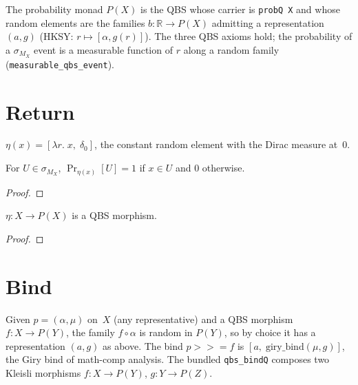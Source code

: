\begin{definition}\label{def:monadP}
  \rocqok
  The probability monad $P(X)$ is the QBS whose carrier is
  \texttt{probQ X} and whose random elements are the families
  $b : \mathbb{R} \to P(X)$ admitting a representation $(a, g)$
  (HKSY: $r \mapsto [\alpha, g(r)]$). The three QBS axioms hold; the
  probability of a $\sigma_{M_X}$ event is a measurable function of $r$
  along a random family (\texttt{measurable\_qbs\_event}).
\end{definition}


\section{Return}\label{sec:return}

\begin{definition}\label{def:qbs_return}
  \rocqok
  $\eta(x) = [\lambda r.\; x,\; \delta_0]$, the constant random element
  with the Dirac measure at~$0$.
\end{definition}

\begin{lemma}\label{lem:qbs_return_event}
  \rocqok
  For $U \in \sigma_{M_X}$, $\Pr_{\eta(x)}[U] = 1$ if $x \in U$ and $0$ otherwise.
\end{lemma}
\begin{proof}\rocqok\end{proof}

\begin{lemma}\label{lem:qbs_morphism_return}
  \rocqok
  $\eta : X \to P(X)$ is a QBS morphism.
\end{lemma}
\begin{proof}\rocqok\end{proof}


\section{Bind}\label{sec:bind}

\begin{definition}\label{def:qbs_bind}
  \rocqok
  Given $p = (\alpha, \mu)$ on~$X$ (any representative) and a QBS morphism
  $f : X \to P(Y)$, the family $f \circ \alpha$ is random in $P(Y)$, so by
  choice it has a representation $(a, g)$ as above. The bind
  $p \mathbin{>\!\!>\!\!=} f$ is $[a,\; \mathrm{giry\_bind}(\mu, g)]$,
  the Giry bind of math-comp analysis. The bundled
  \texttt{qbs\_bindQ} composes two Kleisli morphisms
  $f : X \to P(Y)$, $g : Y \to P(Z)$.
\end{definition}

